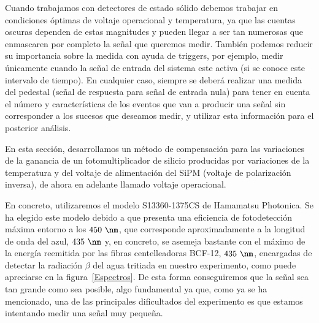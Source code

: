 Cuando trabajamos con detectores de estado sólido debemos trabajar en condiciones óptimas de voltaje operacional y temperatura, ya  que las cuentas oscuras dependen de estas magnitudes y pueden llegar a ser tan numerosas que enmascaren por completo la señal que queremos medir. También podemos reducir su importancia sobre la medida con ayuda de triggers, por ejemplo, medir únicamente cuando la señal de entrada del sistema este activa (si se conoce este intervalo de tiempo). En cualquier caso, siempre se deberá realizar una medida del pedestal (señal de respuesta para señal de entrada nula) para tener en cuenta el número y características de los eventos que van a producir una señal sin corresponder a los sucesos que deseamos medir, y utilizar esta información para el posterior análisis. 

En esta sección, desarrollamos un método de compensación para las variaciones de la ganancia de un fotomultiplicador de silicio producidas por variaciones  de la temperatura y del voltaje de alimentación del SiPM (voltaje de polarización inversa), de ahora en adelante llamado voltaje operacional. 

En concreto, utilizaremos el modelo S13360-1375CS de Hamamatsu Photonica. Se ha elegido este modelo debido a que presenta una eficiencia de fotodetección máxima entorno a los $450~\nm$, que corresponde aproximadamente a la longitud de onda del azul, $435~\nm$ y, en concreto, se asemeja bastante con el máximo de la energía reemitida por las fibras centelleadoras BCF-12, $435~\nm$, encargadas de detectar la radiación $\beta$ del agua tritiada en nuestro experimento, como puede apreciarse en la  figura~\ref{Espectros}. De esta forma conseguiremos que la señal sea tan grande como sea posible, algo fundamental ya que, como ya se ha mencionado, una de las principales dificultados del experimento es que estamos intentando medir una señal muy pequeña.

